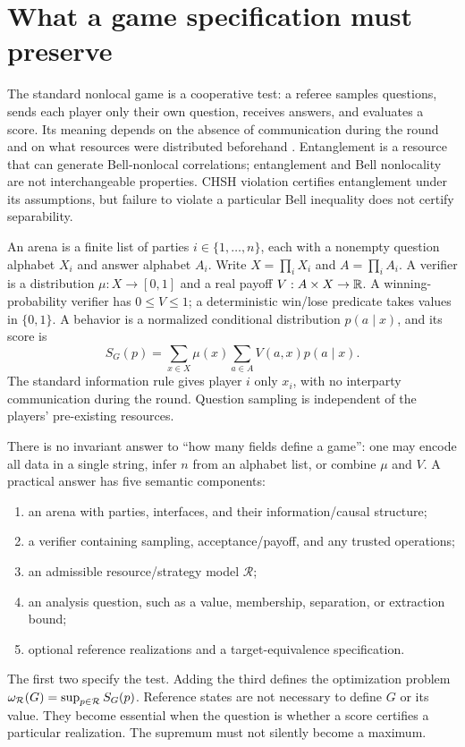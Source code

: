 \section{What a game specification must preserve}
\label{sec:semantics}

The standard nonlocal game is a cooperative test: a referee samples questions,
sends each player only their own question, receives answers, and evaluates a
score. Its meaning depends on the absence of communication during the round and
on what resources were distributed beforehand \cite{cleve2004}. Entanglement is
a resource that can generate Bell-nonlocal correlations; entanglement and Bell
nonlocality are not interchangeable properties. CHSH violation certifies
entanglement under its assumptions, but failure to violate a particular Bell
inequality does not certify separability.

\begin{definition}
An arena is a finite list of parties $i\in\{1,\ldots,n\}$, each with a nonempty
question alphabet $X_i$ and answer alphabet $A_i$. Write
$X=\prod_iX_i$ and $A=\prod_iA_i$. A verifier is a distribution
$\mu:X\to[0,1]$ and a real payoff $V:A\times X\to\mathbb R$. A winning-probability
verifier has $0\leq V\leq1$; a deterministic win/lose predicate takes values in
$\{0,1\}$. A behavior is a normalized conditional distribution $p(a\mid x)$,
and its score is
\begin{equation}
 S_G(p)=\sum_{x\in X}\mu(x)\sum_{a\in A}V(a,x)p(a\mid x).
 \label{eq:score}
\end{equation}
The standard information rule gives player $i$ only $x_i$, with no interparty
communication during the round. Question sampling is independent of the
players' pre-existing resources.
\end{definition}

There is no invariant answer to ``how many fields define a game'': one may
encode all data in a single string, infer $n$ from an alphabet list, or combine
$\mu$ and $V$. A practical answer has five semantic components:
\begin{enumerate}
\item an arena with parties, interfaces, and their information/causal structure;
\item a verifier containing sampling, acceptance/payoff, and any trusted operations;
\item an admissible resource/strategy model $\mathcal R$;
\item an analysis question, such as a value, membership, separation, or extraction bound;
\item optional reference realizations and a target-equivalence specification.
\end{enumerate}
The first two specify the test. Adding the third defines the optimization
problem $\omega_{\mathcal R}(G)=\sup_{p\in\mathcal R}S_G(p)$. Reference states
are not necessary to define $G$ or its value. They become essential when the
question is whether a score certifies a particular realization. The supremum
must not silently become a maximum.

